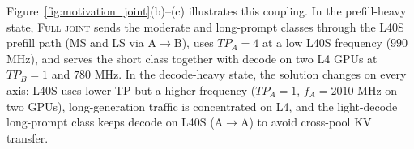 Figure~\ref{fig:motivation_joint}(b)--(c) illustrates this coupling. 
In the prefill-heavy state, \textsc{Full joint} sends the moderate and long-prompt classes through the L40S prefill path (MS and LS via A$\rightarrow$B), uses $TP_A{=}4$ at a low L40S frequency ($990$ MHz), and serves the short class together with decode on two L4 GPUs at $TP_B{=}1$ and $780$ MHz. 
In the decode-heavy state, the solution changes on every axis: L40S uses lower TP but a higher frequency ($TP_A{=}1$, $f_A{=}2010$ MHz on two GPUs), long-generation traffic is concentrated on L4, and the light-decode long-prompt class keeps decode on L40S (A$\rightarrow$A) to avoid cross-pool KV transfer. 


